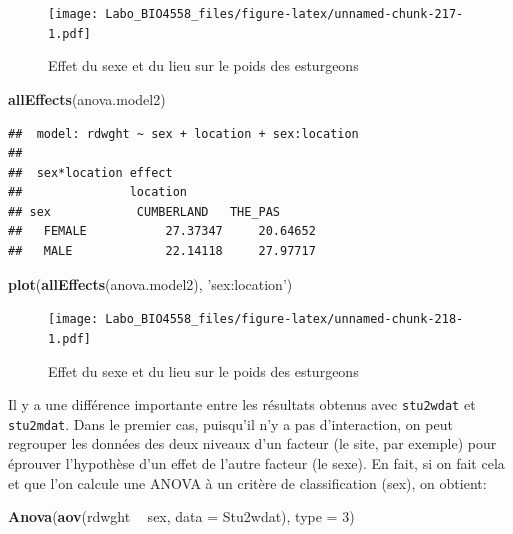 \documentclass[12pt,]{book}
\newenvironment{Shaded}{\begin{snugshade}}{\end{snugshade}}
\newcommand{\DataTypeTok}[1]{\textcolor[rgb]{0.13,0.29,0.53}{#1}}
\newcommand{\DecValTok}[1]{\textcolor[rgb]{0.00,0.00,0.81}{#1}}
\newcommand{\KeywordTok}[1]{\textcolor[rgb]{0.13,0.29,0.53}{\textbf{#1}}}
\newcommand{\NormalTok}[1]{#1}
\newcommand{\OperatorTok}[1]{\textcolor[rgb]{0.81,0.36,0.00}{\textbf{#1}}}
\newcommand{\StringTok}[1]{\textcolor[rgb]{0.31,0.60,0.02}{#1}}
\begin{document}
\begin{figure}
\centering
\texttt{[image: Labo\_BIO4558\_files/figure-latex/unnamed-chunk-217-1.pdf]}
\caption{\label{fig:unnamed-chunk-217}Effet du sexe et du lieu sur le poids des esturgeons}
\end{figure}

\begin{Shaded}
\begin{Highlighting}[]
\KeywordTok{allEffects}\NormalTok{(anova.model2)}
\end{Highlighting}
\end{Shaded}

\begin{verbatim}
##  model: rdwght ~ sex + location + sex:location
## 
##  sex*location effect
##               location
## sex            CUMBERLAND   THE_PAS     
##   FEMALE           27.37347     20.64652
##   MALE             22.14118     27.97717
\end{verbatim}

\begin{Shaded}
\begin{Highlighting}[]
\KeywordTok{plot}\NormalTok{(}\KeywordTok{allEffects}\NormalTok{(anova.model2), }\StringTok{'sex:location'}\NormalTok{)}
\end{Highlighting}
\end{Shaded}

\begin{figure}
\centering
\texttt{[image: Labo\_BIO4558\_files/figure-latex/unnamed-chunk-218-1.pdf]}
\caption{\label{fig:unnamed-chunk-218}Effet du sexe et du lieu sur le poids des esturgeons}
\end{figure}

Il y a une différence importante entre les résultats obtenus avec \texttt{stu2wdat} et \texttt{stu2mdat}. Dans le premier cas, puisqu'il n'y a pas d'interaction, on peut regrouper les données des deux niveaux d'un facteur (le site, par exemple) pour éprouver l'hypothèse d'un effet de l'autre facteur (le sexe). En fait, si on fait cela et que l'on calcule une ANOVA à un critère de classification (sex), on obtient:

\begin{Shaded}
\begin{Highlighting}[]
\KeywordTok{Anova}\NormalTok{(}\KeywordTok{aov}\NormalTok{(rdwght }\OperatorTok{~}\StringTok{ }\NormalTok{sex, }\DataTypeTok{data =}\NormalTok{ Stu2wdat), }\DataTypeTok{type =} \DecValTok{3}\NormalTok{)}
\end{Highlighting}
\end{Shaded}
\end{document}
